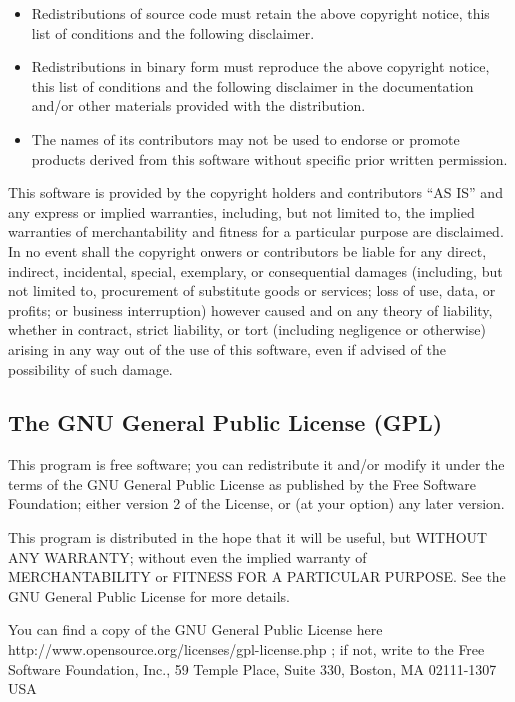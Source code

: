 \documentclass{article}
\begin{document}
\begin{itemize}
\item
Redistributions of source code must retain the above copyright notice, 
this list of conditions and the following disclaimer.
\item
Redistributions in binary form must reproduce the above copyright notice, 
this list of conditions and the following disclaimer in the documentation 
and/or other materials provided with the distribution.
\item
The names of its contributors may not be used to endorse or promote 
products derived from this software without specific prior written permission.
\end{itemize}

\begin{sc}
This software is provided by the copyright holders and contributors ``AS IS'' 
and any express or implied warranties, including, but not limited to, 
the implied warranties of merchantability and fitness for a particular 
purpose are disclaimed. In no event shall the copyright onwers or
contributors be liable for any direct, indirect, incidental, special,
exemplary, or consequential damages (including, but not limited to,
procurement of substitute goods or services; loss of use, data, or profits;
or business interruption) however caused and on any theory of liability,
whether in contract, strict liability, or tort (including negligence or
otherwise) arising in any way out of the use of this software,
even if advised of the possibility of such damage.
\end{sc}

\subsection{The GNU General Public License (GPL)}

This program is free software; you can redistribute it and/or modify it under the terms of the GNU General Public License as published by the Free Software Foundation; either version 2 of the License, or (at your option) any later version.

This program is distributed in the hope that it will be useful, but WITHOUT ANY WARRANTY; without even the implied warranty of MERCHANTABILITY or FITNESS FOR A PARTICULAR PURPOSE. See the GNU General Public License for more details.

You can find a copy of
the GNU General Public License 
\htmladdnormallinkfoot
{here}
{http://www.opensource.org/licenses/gpl-license.php}
; 
if not, write to the Free Software Foundation, Inc., 59 Temple Place, 
Suite 330, Boston, MA 02111-1307 USA
\end{document}
